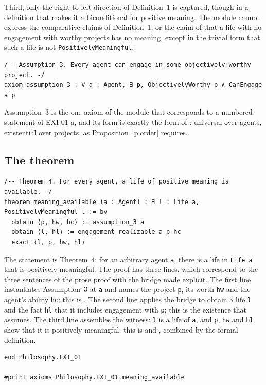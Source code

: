 Third, only the right-to-left direction of Definition~1 is captured, though in a definition that makes it a biconditional for positive meaning. The module cannot express the comparative claims of Definition~1, or the claim of  that a life with no engagement with worthy projects has no meaning, except in the trivial form that such a life is not \texttt{PositivelyMeaningful}.

\begin{lstlisting}
/-- Assumption 3. Every agent can engage in some objectively worthy project. -/
axiom assumption_3 : ∀ a : Agent, ∃ p, ObjectivelyWorthy p ∧ CanEngage a p
\end{lstlisting}

Assumption~3 is the one axiom of the module that corresponds to a numbered statement of EXI-01-a, and its form is exactly the form of : universal over agents, existential over projects, as Proposition~\ref{p:order} requires.

\subsection{The theorem}

\begin{lstlisting}
/-- Theorem 4. For every agent, a life of positive meaning is available. -/
theorem meaning_available (a : Agent) : ∃ l : Life a, PositivelyMeaningful l := by
  obtain ⟨p, hw, hc⟩ := assumption_3 a
  obtain ⟨l, hl⟩ := engagement_realizable a p hc
  exact ⟨l, p, hw, hl⟩
\end{lstlisting}

The statement is Theorem~4: for an arbitrary agent \texttt{a}, there is a life in \texttt{Life a} that is positively meaningful. The proof has three lines, which correspond to the three sentences of the prose proof with the bridge made explicit. The first line instantiates Assumption~3 at \texttt{a} and names the project \texttt{p}, its worth \texttt{hw} and the agent's ability \texttt{hc}; this is . The second line applies the bridge to obtain a life \texttt{l} and the fact \texttt{hl} that it includes engagement with \texttt{p}; this is the existence that  assumes. The third line assembles the witness: \texttt{l} is a life of \texttt{a}, and \texttt{p}, \texttt{hw} and \texttt{hl} show that it is positively meaningful; this is  and , combined by the formal definition.

\begin{lstlisting}
end Philosophy.EXI_01

#print axioms Philosophy.EXI_01.meaning_available
\end{lstlisting}

